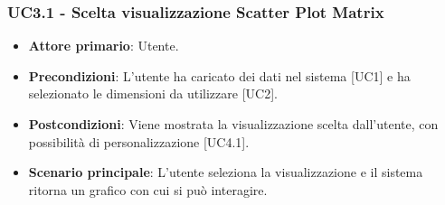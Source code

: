 \subsubsection{UC3.1 - Scelta visualizzazione Scatter Plot Matrix}
\begin{itemize}
	\item \textbf{Attore primario}: Utente.
	\item \textbf{Precondizioni}: L'utente ha caricato dei dati nel sistema [UC1] e ha selezionato le dimensioni da utilizzare [UC2].
	\item \textbf{Postcondizioni}: Viene mostrata la visualizzazione  scelta dall'utente, con possibilità di personalizzazione [UC4.1].
	\item \textbf{Scenario principale}: L'utente seleziona la visualizzazione  e il sistema ritorna un grafico con cui si può interagire.
\end{itemize}